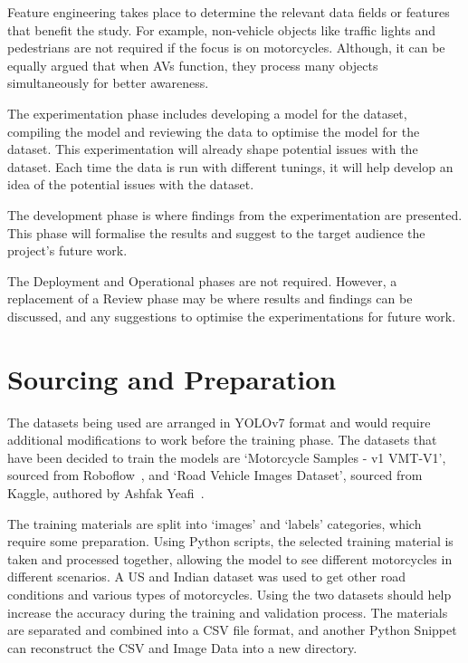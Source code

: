 \documentclass[12pt]{report} %
\begin{document}
        Feature engineering takes place to determine the relevant data fields or features that benefit the study. For example, non-vehicle objects like traffic lights and pedestrians are not required if the focus is on motorcycles. Although, it can be equally argued that when AVs function, they process many objects simultaneously for better awareness. 
      
        The experimentation phase includes developing a model for the dataset, compiling the model and reviewing the data to optimise the model for the dataset. This experimentation will already shape potential issues with the dataset. Each time the data is run with different tunings, it will help develop an idea of the potential issues with the dataset. 
      
        The development phase is where findings from the experimentation are presented. This phase will formalise the results and suggest to the target audience the project's future work. 
      
        The Deployment and Operational phases are not required. However, a replacement of a Review phase may be where results and findings can be discussed, and any suggestions to optimise the experimentations for future work.

	\section{Sourcing and Preparation}
		The datasets being used are arranged in YOLOv7 format and would require additional modifications to work before the training phase. The datasets that have been decided to train the models are `Motorcycle Samples - v1 VMT-V1', sourced from Roboflow~\cite{roboflow_motorcycle_nodate}, and `Road Vehicle Images Dataset', sourced from Kaggle, authored by Ashfak Yeafi~\cite{ashfak_yeafi_road_nodate}.

		The training materials are split into `images' and `labels' categories, which require some preparation. Using Python scripts, the selected training material is taken and processed together, allowing the model to see different motorcycles in different scenarios. A US and Indian dataset was used to get other road conditions and various types of motorcycles. Using the two datasets should help increase the accuracy during the training and validation process. The materials are separated and combined into a CSV file format, and another Python Snippet can reconstruct the CSV and Image Data into a new directory.
\end{document}
